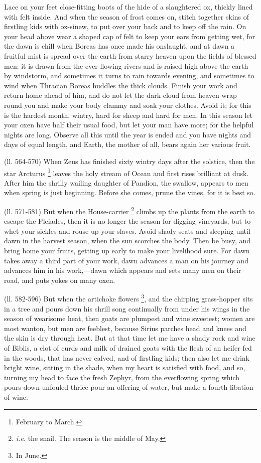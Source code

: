 Lace on your feet close-fitting boots of the hide of a slaughtered ox, thickly
lined with felt inside. And when the season of frost comes on, stitch together
skins of firstling kids with ox-sinew, to put over your back and to keep off
the rain. On your head above wear a shaped cap of felt to keep your ears from
getting wet, for the dawn is chill when Boreas has once made his onslaught, and
at dawn a fruitful mist is spread over the earth from starry heaven upon the
fields of blessed men: it is drawn from the ever flowing rivers and is raised
high above the earth by windstorm, and sometimes it turns to rain towards
evening, and sometimes to wind when Thracian Boreas huddles the thick clouds.
Finish your work and return home ahead of him, and do not let the dark cloud
from heaven wrap round you and make your body clammy and soak your clothes.
Avoid it; for this is the hardest month, wintry, hard for sheep and hard for
men. In this season let your oxen have half their usual food, but let your man
have more; for the helpful nights are long. Observe all this until the year is
ended and you have nights and days of equal length, and Earth, the mother of
all, bears again her various fruit.

(ll. 564-570) When Zeus has finished sixty wintry days after the solstice, then
the star Arcturus \footnote{February to March.} leaves the holy stream of Ocean
and first rises brilliant at dusk. After him the shrilly wailing daughter of
Pandion, the swallow, appears to men when spring is just beginning. Before she
comes, prune the vines, for it is best so.

(ll. 571-581) But when the House-carrier \footnote{\emph{i.e.} the snail. The
season is the middle of May.} climbs up
the plants from the earth to escape the Pleiades, then it is no longer the
season for digging vineyards, but to whet your sickles and rouse up your
slaves. Avoid shady seats and sleeping until dawn in the harvest season, when
the sun scorches the body. Then be busy, and bring home your fruits, getting up
early to make your livelihood sure. For dawn takes away a third part of your
work, dawn advances a man on his journey and advances him in his
work,—dawn which appears and sets many men on their road, and puts yokes
on many oxen.

(ll. 582-596) But when the artichoke flowers \footnote{In June.}, and the
chirping grass-hopper sits in a tree and pours down his shrill song continually
from under his wings in the season of wearisome heat, then goats are plumpest
and wine sweetest; women are most wanton, but men are feeblest, because Sirius
parches head and knees and the skin is dry through heat. But at that time let
me have a shady rock and wine of Biblis, a clot of curds and milk of drained
goats with the flesh of an heifer fed in the woods, that has never calved, and
of firstling kids; then also let me drink bright wine, sitting in the shade,
when my heart is satisfied with food, and so, turning my head to face the fresh
Zephyr, from the everflowing spring which pours down unfouled thrice pour an
offering of water, but make a fourth libation of wine.

